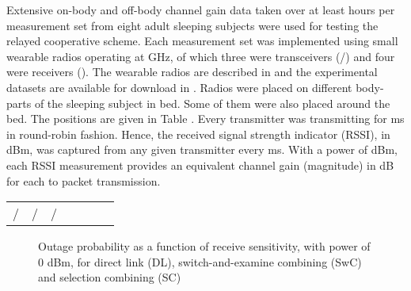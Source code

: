 \documentclass[twocolumn]{el-author}
\newlength \figwidth
\begin{document}
Extensive on-body and off-body channel gain data taken over at least  hours per measurement set from eight adult sleeping subjects were used for testing the relayed cooperative scheme. Each measurement set was implemented using  small wearable radios operating at  GHz, of which three were transceivers (/) and four were receivers (). The wearable radios are described in \cite{4} and the experimental datasets are available for download in \cite{5}. Radios were placed on different body-parts of the sleeping subject in bed. Some of them were also placed around the bed. The positions are given in Table . 
Every transmitter was transmitting for ms in round-robin fashion. Hence, the received signal strength indicator (RSSI), in dBm, was captured from any given transmitter every ms. With a  power of  dBm, each RSSI measurement provides an equivalent channel gain (magnitude) in dB for each  to  packet transmission.

\begin{table}[h]
{\begin{tabular}{ |l|l|l|l|l|l|l| }\hline
 &  &  &  &  &  & \\\hline
/ & / & / &  &  &  & \\\hline
\end{tabular}}{}
\end{table}

\begin{figure}[h]
\caption{Outage probability as a function of receive sensitivity, with  power of 0 dBm, for direct link (DL), switch-and-examine combining (SwC) and selection combining (SC)}
\end{figure}
\end{document}
